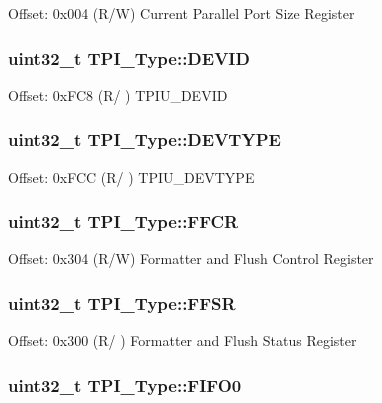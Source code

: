 Offset\-: 0x004 (R/\-W) Current Parallel Port Size Register \hypertarget{structTPI__Type_a4b2e0d680cf7e26728ca8966363a938d}{
\subsubsection[{D\-E\-V\-I\-D}]{ uint32\-\_\-t T\-P\-I\-\_\-\-Type\-::\-D\-E\-V\-I\-D}}\label{structTPI__Type_a4b2e0d680cf7e26728ca8966363a938d}
Offset\-: 0x\-F\-C8 (R/ ) T\-P\-I\-U\-\_\-\-D\-E\-V\-I\-D \hypertarget{structTPI__Type_a16d12c5b1e12f764fa3ec4a51c5f0f35}{
\subsubsection[{D\-E\-V\-T\-Y\-P\-E}]{ uint32\-\_\-t T\-P\-I\-\_\-\-Type\-::\-D\-E\-V\-T\-Y\-P\-E}}\label{structTPI__Type_a16d12c5b1e12f764fa3ec4a51c5f0f35}
Offset\-: 0x\-F\-C\-C (R/ ) T\-P\-I\-U\-\_\-\-D\-E\-V\-T\-Y\-P\-E \hypertarget{structTPI__Type_a3eb42d69922e340037692424a69da880}{
\subsubsection[{F\-F\-C\-R}]{ uint32\-\_\-t T\-P\-I\-\_\-\-Type\-::\-F\-F\-C\-R}}\label{structTPI__Type_a3eb42d69922e340037692424a69da880}
Offset\-: 0x304 (R/\-W) Formatter and Flush Control Register \hypertarget{structTPI__Type_ae67849b2c1016fe6ef9095827d16cddd}{
\subsubsection[{F\-F\-S\-R}]{ uint32\-\_\-t T\-P\-I\-\_\-\-Type\-::\-F\-F\-S\-R}}\label{structTPI__Type_ae67849b2c1016fe6ef9095827d16cddd}
Offset\-: 0x300 (R/ ) Formatter and Flush Status Register \hypertarget{structTPI__Type_ae91ff529e87d8e234343ed31bcdc4f10}{
\subsubsection[{F\-I\-F\-O0}]{ uint32\-\_\-t T\-P\-I\-\_\-\-Type\-::\-F\-I\-F\-O0}}\label{structTPI__Type_ae91ff529e87d8e234343ed31bcdc4f10}
